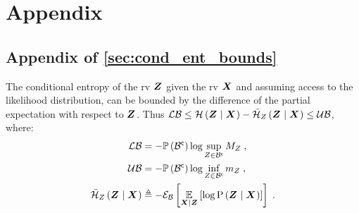 \chapter{Appendix}\label{sec:appendix}

\section{Appendix of \autoref{sec:cond_ent_bounds}}
\begin{proposition}
	\label{thm:observation_bounds}
	The conditional entropy of the \gls{rv} $\boldsymbol Z_{}$ given the \gls{rv} $\boldsymbol X_{}$ and assuming access to the likelihood distribution, can be bounded by the difference of the partial expectation with respect to $\boldsymbol Z_{}$. Thus $\operatorname*{\mathcal{LB}}\leq\mathcal{H}\left({\boldsymbol Z_{}}\mid{\ensuremath{\boldsymbol X_{}}}\right)-\bar{\mathcal{H}}_{Z_{}}\left({\boldsymbol Z_{}}\mid{\ensuremath{\boldsymbol X_{}}}\right)\leq\operatorname*{\mathcal{UB}}$, where:
	\begin{subequations}
		\begin{align}
			\operatorname*{\mathcal{LB}}&=-\mathbb{P}\left({{\mathcal B}^{\mathsf{c}}}\right)\log\sup_{Z_{}\in{\ensuremath{\mathcal B}}^{\mathsf{c}}}M_{Z_{}}\;,\\
			\operatorname*{\mathcal{UB}}& =-\mathbb{P}\left({{\mathcal B}^{\mathsf{c}}}\right)\log\inf_{Z_{}\in{\ensuremath{\mathcal B}}^{\mathsf{c}}}m_{Z_{}}\;,\\
			\bar{\mathcal{H}}_{Z_{}}\left({\boldsymbol Z_{}}\mid{\ensuremath{\boldsymbol X_{}}}\right) &\triangleq-\mathcal{E}_{\mathcal B}\left[{\operatorname*{\mathbb{E}}\limits_{\boldsymbol X_{}\mid\boldsymbol Z_{}}\left[{\log\mathrm{P}\left({\boldsymbol Z_{}}\mid{\ensuremath{\boldsymbol X_{}}}\right)}\right]}\right]\;.
		\end{align}
	\end{subequations}
\end{proposition}
